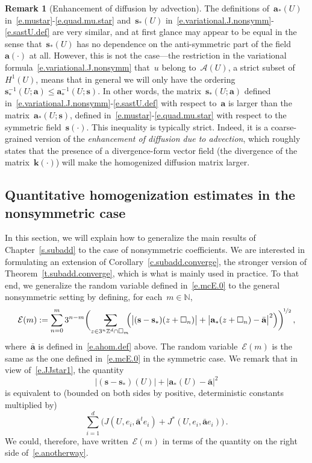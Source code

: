 \documentclass[11pt,twoside]{article} %
\makeatletter
\let\oldsquare\square %
\renewcommand{\square}{\oldsquare}
\numberwithin{equation}{section}
\theoremstyle{definition}
\newtheorem{remark}[theorem]{Remark}
\newcommand*{\N}{\ensuremath{\mathbb{N}}}
\newcommand*{\Zd}{\ensuremath{\mathbb{Z}^d}}
\newcommand{\s}{\mathbf{s}}
\renewcommand{\a}{\mathbf{a}}
\renewcommand{\k}{\mathbf{k}}
\newcommand{\ahom}{\bar{\a}}
\newcommand{\cu}{\square}
\newcommand{\avsum}{\mathop{\mathpalette\avsuminner\relax}\displaylimits}
\newcommand\avsuminner[2]{%
  {\sbox0{$\m@th#1\sum$}%
   \vphantom{\usebox0}%
   \ooalign{%
     \hidewidth
     \smash{\,\rule[.23em]{8.8pt}{1.1pt} \relax}%
     \hidewidth\cr
   ~$\m@th#1\sum$\cr
   }%
  }%
}
\newcommand{\A}{\mathcal{A}}
\makeatother
\begin{document}
\begin{remark}[Enhancement of diffusion by advection]
The definitions of~$\a_*(U)$ in~\eqref{e.mustar}-\eqref{e.quad.mu.star} and~$\s_*(U)$ in~\eqref{e.variational.J.nonsymm}-\eqref{e.sastU.def} are very similar, and at first glance may appear to be equal in the sense that~$\s_*(U)$ has no dependence on the anti-symmetric part of the field~$\a(\cdot)$ at all. However, this is not the case---the restriction in the variational formula~\eqref{e.variational.J.nonsymm} that~$u$ belong to~$\A(U)$, a strict subset of~$H^1(U)$, means that in general we will only have the ordering~$\s_*^{-1}(U;\a) \leq \a_*^{-1}(U;\s)$. In other words, the matrix~$\s_*(U;\a)$ defined in~\eqref{e.variational.J.nonsymm}-\eqref{e.sastU.def} with respect to~$\a$ is larger than the matrix~$\a_*(U;\s)$, defined in~\eqref{e.mustar}-\eqref{e.quad.mu.star} with respect to the symmetric field~$\s(\cdot)$. This inequality is typically strict. Indeed, it is a coarse-grained version of the \emph{enhancement of diffusion due to advection}, which roughly states that the presence of a divergence-form vector field (the divergence of the matrix~$\k(\cdot)$) will make the homogenized diffusion matrix larger. 
\end{remark} 

\subsection{Quantitative homogenization estimates in the nonsymmetric case}
\label{ss.subadd.conv.nosymm}

In this section, we will explain how to generalize the main results of Chapter~\ref{s.subadd} to the case of nonsymmetric coefficients. 
We are interested in formulating an extension of Corollary~\ref{c.subadd.converge}, the stronger version of Theorem~\ref{t.subadd.converge}, which is what is mainly used in practice. 
To that end, we generalize the random variable defined in~\eqref{e.mcE.0} to the general nonsymmetric setting by defining, for each~$m\in\N$,
\begin{align} 
\label{e.mcE.0.nonsymm}
\mathcal{E}(m) 
:= 
\sum_{n=0}^{m}
3^{n-m} 
\biggl( 
\avsum_{z\in 3^n\Zd\cap \cu_m}
\!\!
\Bigl( \bigl| (\s- \s_*)(z+\cu_n)  \bigr|
+
\bigl| \a_*(z+\cu_n) - \ahom \bigr|^2
\Bigr) 
\biggr)^{\!\nicefrac12} 
\,,
\end{align}
where~$\ahom$ is defined in~\eqref{e.ahom.def} above. 
The random variable~$\mathcal{E}(m)$ is the same as the one defined in~\eqref{e.mcE.0} in the symmetric case. 
We remark that in view of~\eqref{e.JJstar1}, the quantity 
\begin{equation}
\label{e.oneway}
\bigl| (\s- \s_*)(U)  \bigr|
+
\bigl| \a_*(U) - \ahom \bigr|^2
\end{equation}
is equivalent to (bounded on both sides by positive, deterministic constants multiplied by) 
\begin{equation}
\label{e.anotherway}
\sum_{i=1}^d 
\bigl( 
J(U,e_i,\ahom^t e_i ) + J^*(U,e_i,\ahom e_i )
\bigr) \,.
\end{equation}
We could, therefore, have written~$\mathcal{E}(m)$ in terms of the quantity on the right side of~\eqref{e.anotherway}. 
\end{document}
